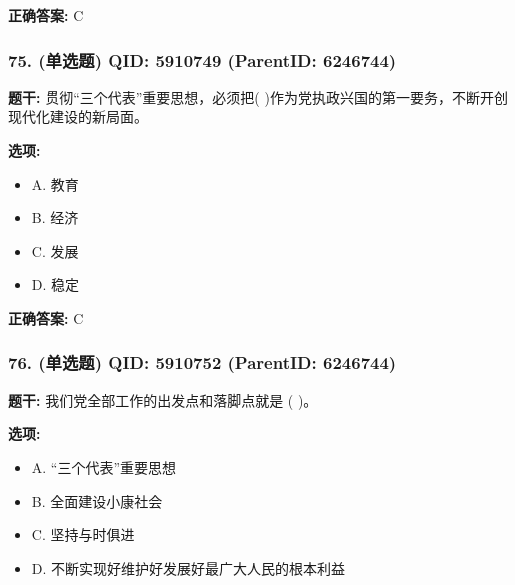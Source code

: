 \documentclass[12pt,UTF8]{ctexart}
\begin{document}
\textbf{正确答案:}
C

\vspace{0.3em}\hrulefill\vspace{0.7em}

\subsubsection*{75. (单选题) \small QID: 5910749 (ParentID: 6246744)}

\textbf{题干:}
贯彻“三个代表”重要思想，必须把( )作为党执政兴国的第一要务，不断开创现代化建设的新局面。



\textbf{选项:}
\begin{itemize}[leftmargin=*]

  \item A. 教育

  \item B. 经济

  \item C. 发展

  \item D. 稳定

\end{itemize}

\textbf{正确答案:}
C

\vspace{0.3em}\hrulefill\vspace{0.7em}

\subsubsection*{76. (单选题) \small QID: 5910752 (ParentID: 6246744)}

\textbf{题干:}
我们党全部工作的出发点和落脚点就是 ( )。



\textbf{选项:}
\begin{itemize}[leftmargin=*]

  \item A. “三个代表”重要思想

  \item B. 全面建设小康社会

  \item C. 坚持与时俱进

  \item D. 不断实现好维护好发展好最广大人民的根本利益

\end{itemize}
\end{document}
